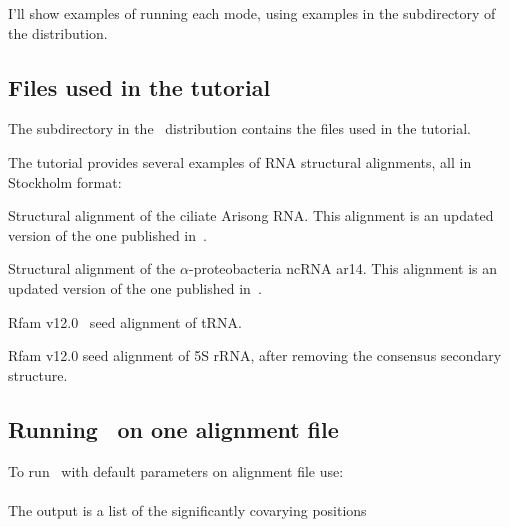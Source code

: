I'll show examples of running each mode, using examples in the
 subdirectory of the distribution.


\subsection{Files used in the tutorial}

The subdirectory  in the \rscape\ distribution contains the
files used in the tutorial. 

The tutorial provides several examples of RNA structural
alignments, all in Stockholm format:

\begin{sreitems}{}
\item[\emprog{updated\_Arisong.sto}] Structural alignment of the ciliate
  Arisong RNA. This alignment is an updated
  version of the one published in~\citep{JungEddy11}.
\item[\emprog{ar14.sto}] Structural alignment of the $\alpha$-proteobacteria ncRNA ar14. This alignment is an updated version of the one
  published in~\citep{delVal12}.
\item[\emprog{RF00005.sto}] Rfam v12.0~\citep{Nawrocki15} seed alignment of tRNA. 
\item[\emprog{RF00001-noss.sto}] Rfam v12.0 seed alignment of 5S rRNA, after removing the consensus secondary structure. 
\end{sreitems}


\subsection{Running \rscape\, on one alignment file}
To run \rscape\ with default parameters on alignment file
 use:\\

\\

\noindent
The output is a list of the significantly covarying positions

